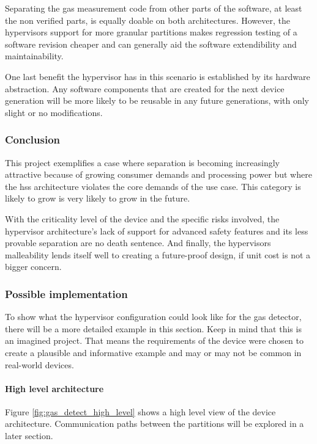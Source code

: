 Separating the gas measurement code from other parts of the software, at least the non verified parts, is equally doable on both architectures. However, the hypervisors support for more granular partitions makes regression testing of a software revision cheaper and can generally aid the software extendibility and maintainability.

One last benefit the hypervisor has in this scenario is established by its hardware abstraction. Any software components that are created for the next device generation will be more likely to be reusable in any future generations, with only slight or no modifications.
\subsubsection{Conclusion}
This project exemplifies a case where separation is becoming increasingly attractive because of growing consumer demands and processing power but where the \acrshort{hss} architecture violates the core demands of the use case. This category is likely to grow is very likely to grow in the future\cite{ITA.May2016}.

With the criticality level of the device and the specific risks involved, the hypervisor architecture's lack of support for advanced safety features and its less provable separation are no death sentence. And finally, the hypervisors malleability lends itself well to creating a future-proof design, if unit cost is not a bigger concern. 
\subsubsection{Possible implementation}
To show what the hypervisor configuration could look like for the gas detector, there will be a more detailed example in this section. Keep in mind that this is an imagined project. That means the requirements of the device were chosen to create a plausible and informative example and may or may not be common in real-world devices.

\paragraph{High level architecture}
Figure \ref{fig:gas_detect_high_level} shows a high level view of the device architecture. Communication paths between the partitions will be explored in a later section.

